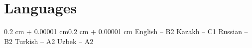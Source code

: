 \documentclass[10pt, letterpaper]{article}
\newenvironment{highlights}{\begin{itemize}[topsep=0.10 cm,parsep=0.10 cm,partopsep=0pt,itemsep=0pt,leftmargin=0.4 cm + 10pt]}{\end{itemize}}
\newenvironment{onecolentry}{\begin{adjustwidth}{0.2 cm + 0.00001 cm}{0.2 cm + 0.00001 cm}}{\end{adjustwidth}}
\let\hrefWithoutArrow\href
\renewcommand{\href}[2]{\hrefWithoutArrow{#1}{\ifthenelse{\equal{#2}{}}{ }{#2 }\raisebox{.15ex}{\footnotesize \faExternalLink*}}}
\begin{document}

\section{Languages}
\begin{onecolentry}
English – B2 \;\; Kazakh – C1 \;\; Russian – B2 \;\;  Turkish – A2  \;\;  Uzbek – A2 \\
\end{onecolentry}
\end{document}
